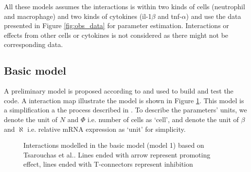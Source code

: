 \documentclass[12pt,a4paper]{report}
\begin{document}
All these models assumes the interactions is within two kinds of cells (neutrophil and macrophage) and two kinds of cytokines (il-1$\beta$ and tnf-$\alpha$) and use the data presented in Figure \ref{fig:obs_data} for parameter estimation. Interactions or effects from other cells or cytokines is not considered as there might not be corresponding data.

\subsection{Basic model}

A preliminary model is proposed according to \cite{ref:Tsarouchas} and used to build and test the code. A interaction map illustrate the model is shown in Figure \ref{fig:m1}. This model is a simplification a the process described in \cite{ref:Tsarouchas}. To describe the parameters' units, we denote the unit of $N$ and $\Phi$ i.e. number of cells as `cell', and denote the unit of $\beta$ and $\aleph$ i.e. relative mRNA expression as `unit' for simplicity.

\begin{figure}
    \begin{center}
    \end{center}
    
    \caption{Interactions modelled in the basic model (model 1) based on Tsarouchas et al.\cite{ref:Tsarouchas}. Lines ended with arrow represent promoting effect, lines ended with T-connectors represent inhibition} 
    \label{fig:m1}
    
\end{figure}
\end{document}
